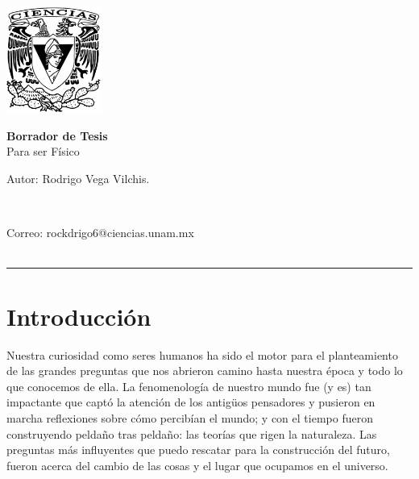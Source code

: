 \documentclass[11pt,a4paper]{article}
\begin{document}
\thispagestyle{empty}
\includegraphics[height=3.5cm]{escudoCiencias.pdf}
\vspace{-3.8cm}
\begin{flushright}
\hspace{4cm}
{\Large\textbf{Borrador de Tesis}\\
Para ser Físico}
\vspace{0.3cm}\\
\begin{large}Autor: Rodrigo Vega Vilchis.\end{large}\\
\begin{footnotesize}
Correo: rockdrigo6@ciencias.unam.mx\\
\\
\end{footnotesize}
\vspace{0.75cm}

\end{flushright}
 \hrule height1pt\vspace{.5cm}


\section{Introducción}


Nuestra curiosidad como seres humanos ha sido el motor para el planteamiento de las grandes preguntas que nos abrieron camino hasta nuestra época y todo lo que conocemos de ella. La fenomenología de nuestro mundo fue (y es) tan impactante que captó la atención de los antigüos pensadores y pusieron en marcha reflexiones sobre cómo percibían el mundo; y con el tiempo fueron construyendo peldaño tras peldaño: las teorías que rigen la naturaleza. Las preguntas más influyentes que puedo rescatar para la construcción del futuro, fueron acerca del cambio de las cosas y el lugar que ocupamos en el universo.
\end{document}
